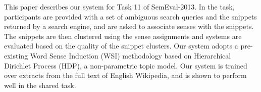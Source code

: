 This paper describes our system for Task 11 of SemEval-2013. In the task, participants are provided with a set of ambiguous search queries
 and the snippets returned by a search engine, and are asked to
 associate senses with the snippets.  The snippets are then clustered
 using the sense assignments and systems are evaluated based on the
 quality of the snippet clusters. Our system adopts a pre-existing Word
 Sense Induction (WSI) methodology based on Hierarchical Dirichlet
 Process (HDP), a non-parametric topic model.  Our system is trained
 over extracts from the full text of English Wikipedia, and is shown to
 perform well in the shared task.

